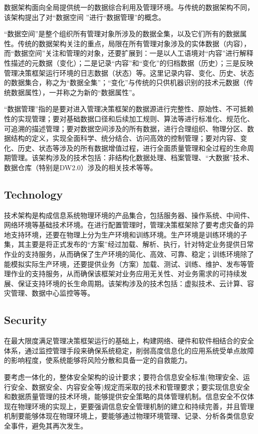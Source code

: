 数据架构面向全局提供统一的数据综合利用及管理环境。与传统的数据架构不同，该架构提出了对“数据空间 ”进行“数据管理”的概念。

“数据空间”是整个组织所有管理对象所涉及的数据全集，以及它们所有的数据属性。传统的数据架构关注的重点，局限在所有管理对象涉及的实体数据（内容），而“数据空间”关注和管理的对象，还要扩展到：一是以人工语境对“内容”进行解释性描述的元数据（变化）；二是记录“内容”和“变化”的归档数据（历史）；三是反映管理决策框架运行环境的日志数据（状态）等。这里记录内容、变化、历史、状态的数据集合，称之为“数据全集”；“变化”与传统的只供机器识别的技术元数据（传统数据属性），一并称之为新的“数据属性”。

“数据管理”指的是要对进入管理决策框架的数据源进行完整性、原始性、不可抵赖性的实现管理；要对基础数据口径和后续加工规则、算法等进行标准化、规范化、可追溯的描述管理；要对数据空间涉及的所有数据，进行合理组织、物理分区、数据结构的定义，实现全面科学、统分结合、访问高效的控制管理；要对内容、变化、历史、状态等涉及的所有数据增值过程，进行全面质量管理和全过程的生命周期管理。该架构涉及的技术包括：非结构化数据处理、档案管理、“大数据”技术、数据仓库（特别是DW2.0）涉及的相关技术等等。

\subsection{Technology}

技术架构是构成信息系统物理环境的产品集合，包括服务器、操作系统、中间件、网络环境等基础技术环境。在进行配置管理时，管理决策框架除了要考虑灾备的异地支持环境，还要在物理上分为生产环境和训练环境。生产环境是训练环境的子集，其主要是将正式发布的“方案”经过加载、解析、执行，针对特定业务提供日常作业的支持服务，从而确保了生产环境的简化、高效、可靠、稳定；训练环境除了能模拟实际生产环境，还要提供业务（方案）加载、测试、训练、维护、发布等管理作业的支持服务，从而确保该框架对业务应用无关性、对业务需求的可持续发展、保证支持环境的长生命周期。该架构涉及的技术包括：虚拟技术、云计算、容灾管理、数据中心监控等等。

\subsection{Security}

在最大限度满足管理决策框架运行的基础上，构建网络、硬件和软件相结合的安全体系，通过监控管理手段来确保系统稳定，削弱高度信息化的应用系统受单点故障的影响程度，使系统能够将风险分散和具备一定的自救能力。

要考虑一体化的，整体安全架构的设计要求；要符合信息安全标准(物理安全、运行安全、数据安全、内容安全等)规定而采取的技术和管理要求；要实现信息安全和数据质量管理的技术环境，能够提供安全策略的具体管理机制。信息安全不仅体现在物理环境的实现上，更要强调信息安全管理机制的建立和持续完善，并且管理机制要能够体现在物理环境上，要能够通过物理环境管理、记录、分析各类信息安全事件，避免其再次发生。


